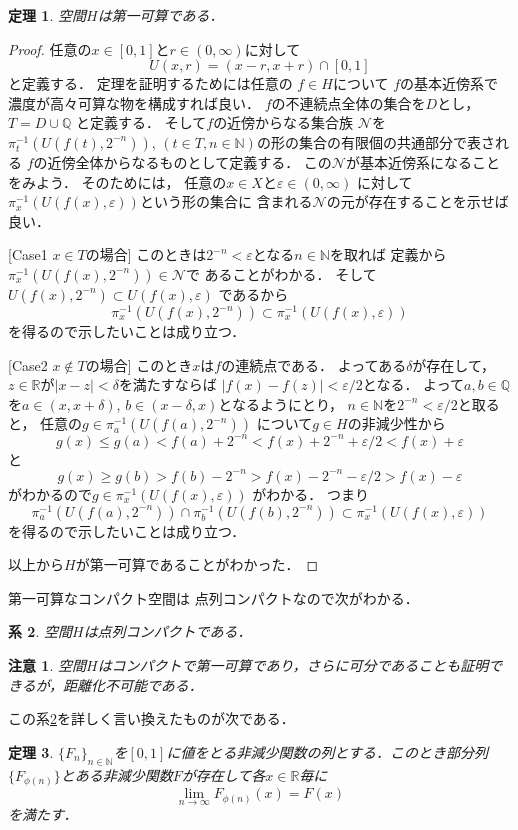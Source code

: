 \documentclass[leqno, 12pt]{jsarticle}
\newtheorem{thm}{定理}
\newtheorem{cor}[thm]{系}
\newtheorem*{rmk}{注意}
\newcommand{\nn}{\mathbb{N}}
\newcommand{\qq}{\mathbb{Q}}
\newcommand{\rr}{\mathbb{R}}
\newcommand{\ep}{\varepsilon}
\begin{document}
\begin{thm}
 空間$H$は第一可算である．
\end{thm}
\begin{proof}
任意の$x\in [0, 1]$と$r\in (0, \infty)$に対して
\[
U(x, r)=(x-r, x+r)\cap [0, 1]
\]
と定義する．
定理を証明するためには任意の
$f\in H$について
$f$の基本近傍系で濃度が高々可算な物を構成すれば良い．
$f$の不連続点全体の集合を$D$とし，
$T=D\cup \qq$
と定義する．
そして$f$の近傍からなる集合族
$\mathcal{N}$を
$\pi_{t}^{-1}(U(f(t), 2^{-n}))$, 
$(t\in T, n\in \nn)$の形の集合の有限個の共通部分で表される
$f$の近傍全体からなるものとして定義する．
この$\mathcal{N}$が基本近傍系になることをみよう．
そのためには，
任意の$x\in X$と$\ep\in (0, \infty)$
に対して
$\pi_{x}^{-1}(U(f(x), \ep))$という形の集合に
含まれる$\mathcal{N}$の元が存在することを示せば良い．

[Case1 $x\in T$の場合]
このときは$2^{-n}<\ep$となる$n\in \nn$を取れば
定義から
$\pi_x^{-1}(U(f(x), 2^{-n}))\in \mathcal{N}$で
あることがわかる．
そして$U(f(x), 2^{-n})\subset U(f(x), \ep)$
であるから
\[
\pi_x^{-1}(U(f(x), 2^{-n}))\subset \pi_x^{-1}(U(f(x), \ep))
\]
を得るので示したいことは成り立つ．

[Case2 $x\not\in T$の場合]
このとき$x$は$f$の連続点である．
よってある$\delta$が存在して，$z\in \rr$が$|x-z|<\delta$を満たすならば
$|f(x)-f(z)|<\ep/2$となる．
よって$a, b\in \qq$を$a\in (x, x+\delta)$, $b\in (x-\delta, x)$となるようにとり，
$n\in \nn$を$2^{-n}<\ep/2$と取ると，
任意の$g\in \pi_{a}^{-1}(U(f(a), 2^{-n}))$
について$g\in H$の非減少性から
\[
g(x)\le g(a)<f(a)+2^{-n}<f(x)+2^{-n}+\ep/2<f(x)+\ep
\]
と
\[
g(x)\ge g(b)>f(b)-2^{-n}> f(x)-2^{-n}-\ep/2>f(x)-\ep
\]
がわかるので$g\in \pi_{x}^{-1}(U(f(x), \ep))$
がわかる．
つまり
\[
\pi_a^{-1}(U(f(a), 2^{-n}))\cap \pi_b^{-1}(U(f(b), 2^{-n}))\subset \pi_x^{-1}(U(f(x), \ep))
\]
を得るので示したいことは成り立つ．

以上から$H$が第一可算であることがわかった．
\end{proof}

第一可算なコンパクト空間は
点列コンパクトなので次がわかる．
\begin{cor}\label{daiji}
空間$H$は点列コンパクトである．
\end{cor}

\begin{rmk}
空間$H$はコンパクトで第一可算であり，さらに可分であることも証明できるが，距離化不可能である．
\end{rmk}

この系\ref{daiji}を詳しく言い換えたものが次である．
\begin{thm}\label{daiji2}
$\{F_n\}_{n\in \nn}$を$[0, 1]$に値をとる非減少関数の列とする．このとき部分列$\{F_{\phi(n)}\}$とある非減少関数$F$が存在して各$x\in \rr$毎に
\[
\lim_{n\to \infty}F_{\phi(n)}(x)=F(x)
\]
を満たす．
\end{thm}
\end{document}
